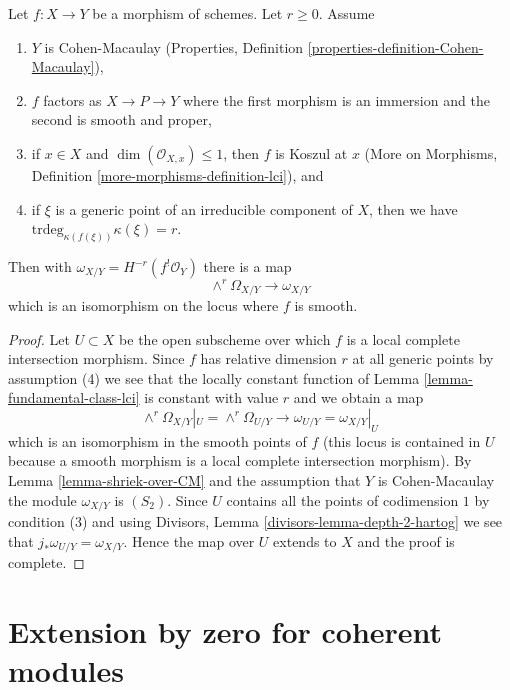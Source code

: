 \begin{lemma}
\label{lemma-fundamental-class-almost-lci}
Let $f : X \to Y$ be a morphism of schemes. Let $r \geq 0$. Assume
\begin{enumerate}
\item $Y$ is Cohen-Macaulay (Properties, Definition
\ref{properties-definition-Cohen-Macaulay}),
\item $f$ factors as $X \to P \to Y$ where the first morphism is
an immersion and the second is smooth and proper,
\item if $x \in X$ and $\dim(\mathcal{O}_{X, x}) \leq 1$,
then $f$ is Koszul at $x$ (More on Morphisms, Definition
\ref{more-morphisms-definition-lci}), and
\item if $\xi$ is a generic point of an irreducible component of $X$, then
we have
$\text{trdeg}_{\kappa(f(\xi))} \kappa(\xi) = r$.
\end{enumerate}
Then with $\omega_{X/Y} = H^{-r}(f^!\mathcal{O}_Y)$ there is a map
$$
\wedge^r\Omega_{X/Y} \longrightarrow \omega_{X/Y}
$$
which is an isomorphism on the locus where $f$ is smooth.
\end{lemma}

\begin{proof}
Let $U \subset X$ be the open subscheme over which $f$ is a
local complete intersection morphism. Since $f$ has relative
dimension $r$ at all generic points by assumption (4) we
see that the locally constant function of
Lemma \ref{lemma-fundamental-class-lci}
is constant with value $r$ and we obtain a map
$$
\wedge^r\Omega_{X/Y}|_U = \wedge^r \Omega_{U/Y}
\longrightarrow
\omega_{U/Y} = \omega_{X/Y}|_U
$$
which is an isomorphism in the smooth points of $f$ (this locus
is contained in $U$ because a smooth morphism is a local complete
intersection morphism). By Lemma \ref{lemma-shriek-over-CM}
and the assumption that $Y$ is Cohen-Macaulay
the module $\omega_{X/Y}$ is $(S_2)$.
Since $U$ contains all the points of codimension $1$ by condition (3)
and using Divisors, Lemma \ref{divisors-lemma-depth-2-hartog}
we see that $j_*\omega_{U/Y} = \omega_{X/Y}$.
Hence the map over $U$ extends to $X$ and the proof
is complete.
\end{proof}






\section{Extension by zero for coherent modules}
\label{section-extension-by-zero}

